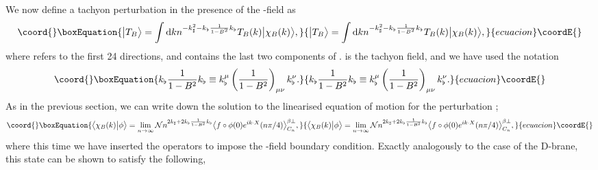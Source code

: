 \documentclass[letterpaper,12pt]{article}
\def\Pcm#1{{\mathcal{#1}}}
\providecommand{\td}{\textup{d}}
\begin{document}
We now define a tachyon perturbation in the presence of the \coordHE{}-field as
\begin{equation}\coord{}\boxEquation{
\label{Tb}
 \big|T_B\big\rangle = \int \td k n^{-\kn^2-\kb\frac1{1-B^2}\kb } T_B(k) \big|\chi_B(k)\big\rangle 
,}{
\big|T_B\big\rangle = \int \td k n^{-\kn^2-\kb\frac1{1-B^2}\kb } T_B(k) \big|\chi_B(k)\big\rangle 
,}{ecuacion}\coordE{}\end{equation}
where \myHighlight{$\kn$}\coordHE{} refers to the first 24 directions, and \myHighlight{$\kb$}\coordHE{} contains the last two components of \coordHE{}.
\coordHE{} is the tachyon field, and we have used the notation 
\begin{equation}\coord{}\boxEquation{
\kb\frac1{1-B^2}\kb \equiv \kb^\mu\left(\frac1{1-B^2}\right)_{\mu\nu}\kb^\nu
.}{
\kb\frac1{1-B^2}\kb \equiv \kb^\mu\left(\frac1{1-B^2}\right)_{\mu\nu}\kb^\nu
.}{ecuacion}\coordE{}\end{equation}
As in the previous section, we can write down the solution to the linearised
equation of motion for the perturbation \coordHE{};
\begin{equation}\coord{}\boxEquation{
\label{chiB}
\big\langle \chi_B(k) \big| \phi \big\rangle = \lim_{n \rightarrow \infty} 
                       \Pcm{N} n^{2\kn+2\kb\frac1{1-B^2}\kb}\big\langle f \circ \phi(0) 
                       e^{ik\cdot X}(n\pi/4)\big\rangle^{\beta \perp}_{C_n}
,}{
\big\langle \chi_B(k) \big| \phi \big\rangle = \lim_{n \rightarrow \infty} 
                       \Pcm{N} n^{2\kn+2\kb\frac1{1-B^2}\kb}\big\langle f \circ \phi(0) 
                       e^{ik\cdot X}(n\pi/4)\big\rangle^{\beta \perp}_{C_n}
,}{ecuacion}\coordE{}\end{equation}
where this time we have inserted the operators \myHighlight{$\beta^\pm$}\coordHE{} to impose the \coordHE{}-field boundary condition.
Exactly analogously to the case of the D\coordHE{}-brane, this state can be shown to satisfy the 
following,
\end{document}
